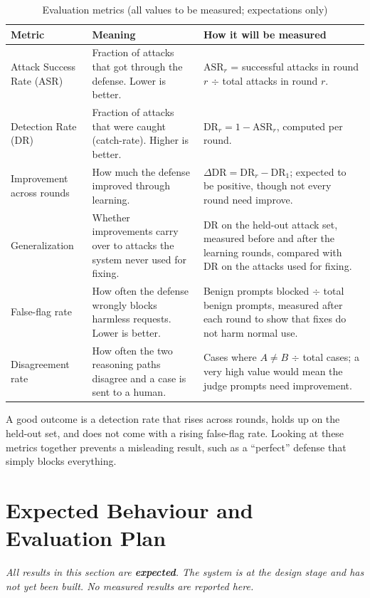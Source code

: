 \begin{table}[H]
\centering
\caption{Evaluation metrics (all values to be measured; expectations only)}
\label{tab:metrics}
\small
\begin{tabularx}{\textwidth}{@{}P{0.19\textwidth} Y Y@{}}
\toprule
\textbf{Metric} & \textbf{Meaning} & \textbf{How it will be measured} \\
\midrule
Attack Success Rate (ASR) & Fraction of attacks that got through the defense. Lower is better. & $\mathrm{ASR}_r$ = successful attacks in round $r$ $\div$ total attacks in round $r$. \\
Detection Rate (DR) & Fraction of attacks that were caught (catch-rate). Higher is better. & $\mathrm{DR}_r = 1 - \mathrm{ASR}_r$, computed per round. \\
Improvement across rounds & How much the defense improved through learning. & $\Delta\mathrm{DR} = \mathrm{DR}_r - \mathrm{DR}_1$; expected to be positive, though not every round need improve. \\
Generalization & Whether improvements carry over to attacks the system never used for fixing. & DR on the held-out attack set, measured before and after the learning rounds, compared with DR on the attacks used for fixing. \\
False-flag rate & How often the defense wrongly blocks harmless requests. Lower is better. & Benign prompts blocked $\div$ total benign prompts, measured after each round to show that fixes do not harm normal use. \\
Disagreement rate & How often the two reasoning paths disagree and a case is sent to a human. & Cases where $A \neq B$ $\div$ total cases; a very high value would mean the judge prompts need improvement. \\
\bottomrule
\end{tabularx}
\end{table}

A good outcome is a detection rate that rises across rounds, holds up on the
held-out set, and does not come with a rising false-flag rate. Looking at these
metrics together prevents a misleading result, such as a ``perfect'' defense that
simply blocks everything.

\section{Expected Behaviour and Evaluation Plan}

\noindent\textit{All results in this section are \textbf{expected}. The system is
at the design stage and has not yet been built. No measured results are
reported here.}

